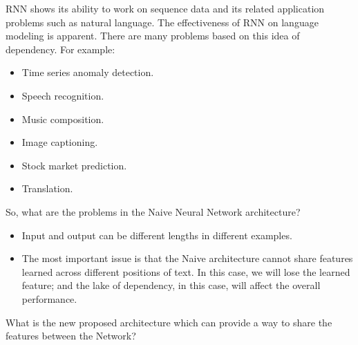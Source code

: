RNN shows its ability to work on sequence data and its related application problems such as natural language\cite{Mikolov_et_al}. The effectiveness of RNN on language modeling is apparent. There are many problems based on this idea of dependency. For example:
\begin{itemize}
\item Time series anomaly detection.
\item Speech recognition.
\item Music composition.
\item Image captioning.
\item Stock market prediction.
\item Translation.
\end{itemize}
So, what are the problems in the Naive Neural Network architecture?
\begin{itemize}
\item Input and output can be different lengths in different examples.
\item The most important issue is that the Naive architecture cannot share features learned across different positions of text. In this case, we will lose the learned feature; and the lake of dependency, in this case, will affect the overall performance.
\end{itemize}
What is the new proposed architecture which can provide a way to share the features between the Network?
